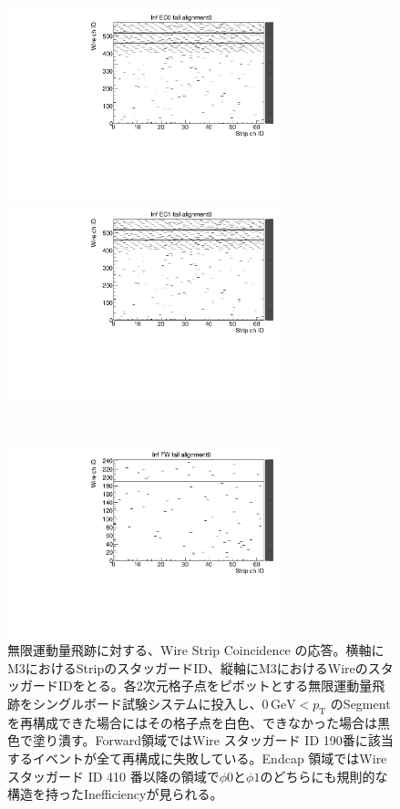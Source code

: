 \begin{figure}
    \begin{minipage}[b]{.5\linewidth}
        \centering
        \includegraphics[height=5.6cm]{fig/Test/A_InfEC0_WS.pdf}
    \end{minipage}
    \begin{minipage}[b]{.5\linewidth}
        \centering
        \includegraphics[height=5.6cm]{fig/Test/A_InfEC1_WS.pdf}
    \end{minipage}\\
    \begin{minipage}[b]{\linewidth}
        \centering
        \includegraphics[height=5.6cm]{fig/Test/A_InfFW_WS.pdf}
    \end{minipage}
    \caption[無限運動量飛跡に対する、Wire Strip Coincidence の応答]{無限運動量飛跡に対する、Wire Strip Coincidence の応答。横軸にM3におけるStripのスタッガードID、縦軸にM3におけるWireのスタッガードIDをとる。各2次元格子点をピボットとする無限運動量飛跡をシングルボード試験システムに投入し、$0\,\mathrm{GeV} < p_\mathrm{T}$ のSegmentを再構成できた場合にはその格子点を白色、できなかった場合は黒色で塗り潰す。Forward領域ではWire スタッガード ID 190番に該当するイベントが全て再構成に失敗している。Endcap 領域ではWire スタッガード ID 410 番以降の領域で$\phi0$と$\phi1$のどちらにも規則的な構造を持ったInefficiencyが見られる。}
    \label{Inf_A_WS}
\end{figure}

